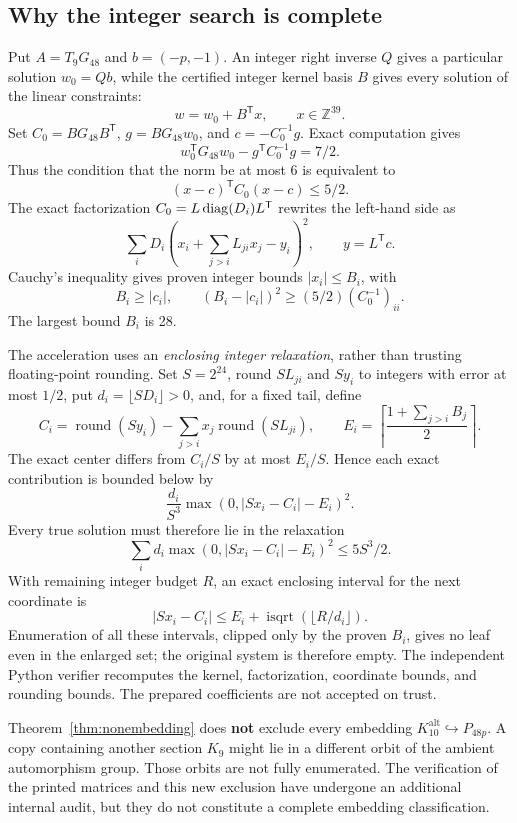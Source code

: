 \documentclass[11pt,a4paper]{article}
\theoremstyle{remark}\newtheorem{remark}[theorem]{Remark}
\newcommand{\Z}{\mathbb Z}\newcommand{\R}{\mathbb R}\newcommand{\F}{\mathbb F}
\newcommand{\Kalt}{K_{10}^{\mathrm{alt}}}
\begin{document}
\subsection{Why the integer search is complete}

Put $A=T_9G_{48}$ and $b=(-p,-1)$. An integer right inverse $Q$ gives a particular solution $w_0=Qb$, while the certified integer kernel basis $B$ gives every solution of the linear constraints:
\[
w=w_0+B^{\mathsf T}x,\qquad x\in\Z^{39}.
\]
Set $C_0=BG_{48}B^{\mathsf T}$, $g=BG_{48}w_0$, and $c=-C_0^{-1}g$. Exact computation gives
\[
w_0^{\mathsf T}G_{48}w_0-g^{\mathsf T}C_0^{-1}g=7/2.
\]
Thus the condition that the norm be at most 6 is equivalent to
\[
(x-c)^{\mathsf T}C_0(x-c)\le5/2.
\]
The exact factorization $C_0=L\operatorname{diag}(D_i)L^{\mathsf T}$ rewrites the left-hand side as
\[
\sum_iD_i\left(x_i+\sum_{j>i}L_{ji}x_j-y_i\right)^2,\qquad y=L^{\mathsf T}c.
\]
Cauchy's inequality gives proven integer bounds $|x_i|\le B_i$, with
\[
B_i\ge|c_i|,\qquad (B_i-|c_i|)^2\ge(5/2)(C_0^{-1})_{ii}.
\]
The largest bound $B_i$ is 28.

The acceleration uses an \emph{enclosing integer relaxation}, rather than trusting floating-point rounding. Set $S=2^{24}$, round $SL_{ji}$ and $Sy_i$ to integers with error at most $1/2$, put $d_i=\lfloor SD_i\rfloor>0$, and, for a fixed tail, define
\[
C_i=\operatorname{round}(Sy_i)-\sum_{j>i}x_j\operatorname{round}(SL_{ji}),\qquad
E_i=\left\lceil\frac{1+\sum_{j>i}B_j}{2}\right\rceil.
\]
The exact center differs from $C_i/S$ by at most $E_i/S$. Hence each exact contribution is bounded below by
\[
\frac{d_i}{S^3}\max(0,|Sx_i-C_i|-E_i)^2.
\]
Every true solution must therefore lie in the relaxation
\[
\sum_i d_i\max(0,|Sx_i-C_i|-E_i)^2\le5S^3/2.
\]
With remaining integer budget $R$, an exact enclosing interval for the next coordinate is
\[
|Sx_i-C_i|\le E_i+\operatorname{isqrt}(\lfloor R/d_i\rfloor).
\]
Enumeration of all these intervals, clipped only by the proven $B_i$, gives no leaf even in the enlarged set; the original system is therefore empty. The independent Python verifier recomputes the kernel, factorization, coordinate bounds, and rounding bounds. The prepared coefficients are not accepted on trust.

Theorem~\ref{thm:nonembedding} does \textbf{not} exclude every embedding $\Kalt\hookrightarrow P_{48p}$. A copy containing another section $K_9$ might lie in a different orbit of the ambient automorphism group. Those orbits are not fully enumerated. The verification of the printed matrices and this new exclusion have undergone an additional internal audit, but they do not constitute a complete embedding classification.
\end{document}
